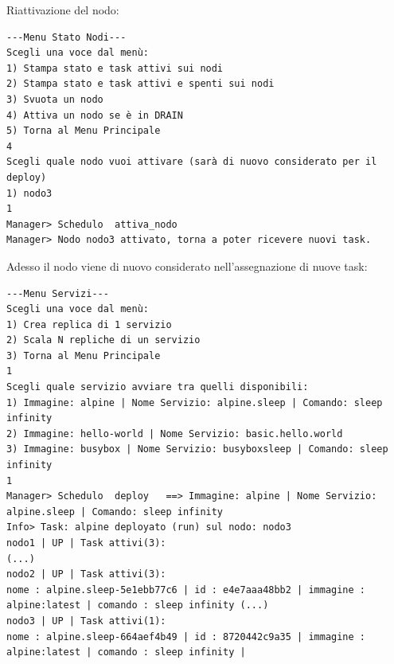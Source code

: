 \documentclass[12pt,a4paper]{article}
\begin{document}
Riattivazione del nodo:
\begin{verbatim}
---Menu Stato Nodi---
Scegli una voce dal menù:
1) Stampa stato e task attivi sui nodi
2) Stampa stato e task attivi e spenti sui nodi
3) Svuota un nodo 
4) Attiva un nodo se è in DRAIN 
5) Torna al Menu Principale
4
Scegli quale nodo vuoi attivare (sarà di nuovo considerato per il deploy)
1) nodo3
1
Manager> Schedulo  attiva_nodo  
Manager> Nodo nodo3 attivato, torna a poter ricevere nuovi task.
\end{verbatim}
Adesso il nodo viene di nuovo considerato nell'assegnazione di nuove task:
\begin{verbatim}
---Menu Servizi---
Scegli una voce dal menù:
1) Crea replica di 1 servizio
2) Scala N repliche di un servizio
3) Torna al Menu Principale
1
Scegli quale servizio avviare tra quelli disponibili:
1) Immagine: alpine | Nome Servizio: alpine.sleep | Comando: sleep infinity
2) Immagine: hello-world | Nome Servizio: basic.hello.world
3) Immagine: busybox | Nome Servizio: busyboxsleep | Comando: sleep infinity
1
Manager> Schedulo  deploy   ==> Immagine: alpine | Nome Servizio: alpine.sleep | Comando: sleep infinity
Info> Task: alpine deployato (run) sul nodo: nodo3
nodo1 | UP | Task attivi(3): 
(...)
nodo2 | UP | Task attivi(3): 
nome : alpine.sleep-5e1ebb77c6 | id : e4e7aaa48bb2 | immagine : alpine:latest | comando : sleep infinity (...)
nodo3 | UP | Task attivi(1): 
nome : alpine.sleep-664aef4b49 | id : 8720442c9a35 | immagine : alpine:latest | comando : sleep infinity | 
\end{verbatim}
\newpage
\end{document}
